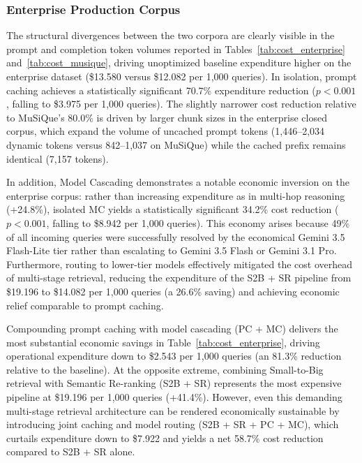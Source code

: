 \subsubsection{Enterprise Production Corpus}
\label{subsubsec:cost_enterprise}

The structural divergences between the two corpora are clearly visible in the prompt and completion token volumes reported in Tables~\ref{tab:cost_enterprise} and~\ref{tab:cost_musique}, driving unoptimized baseline expenditure higher on the enterprise dataset (\$13.580 versus \$12.082 per 1,000 queries). In isolation, prompt caching achieves a statistically significant 70.7\% expenditure reduction ($p < 0.001$, falling to \$3.975 per 1,000 queries). The slightly narrower cost reduction relative to MuSiQue's 80.0\% is driven by larger chunk sizes in the enterprise closed corpus, which expand the volume of uncached prompt tokens (1,446--2,034 dynamic tokens versus 842--1,037 on MuSiQue) while the cached prefix remains identical (7,157 tokens).

In addition, Model Cascading demonstrates a notable economic inversion on the enterprise corpus: rather than increasing expenditure as in multi-hop reasoning (+24.8\%), isolated MC yields a statistically significant 34.2\% cost reduction ($p < 0.001$, falling to \$8.942 per 1,000 queries). This economy arises because 49\% of all incoming queries were successfully resolved by the economical Gemini 3.5 Flash-Lite tier rather than escalating to Gemini 3.5 Flash or Gemini 3.1 Pro. Furthermore, routing to lower-tier models effectively mitigated the cost overhead of multi-stage retrieval, reducing the expenditure of the S2B + SR pipeline from \$19.196 to \$14.082 per 1,000 queries (a 26.6\% saving) and achieving economic relief comparable to prompt caching.



Compounding prompt caching with model cascading (PC + MC) delivers the most substantial economic savings in Table~\ref{tab:cost_enterprise}, driving operational expenditure down to \$2.543 per 1,000 queries (an 81.3\% reduction relative to the baseline). At the opposite extreme, combining Small-to-Big retrieval with Semantic Re-ranking (S2B + SR) represents the most expensive pipeline at \$19.196 per 1,000 queries (+41.4\%). However, even this demanding multi-stage retrieval architecture can be rendered economically sustainable by introducing joint caching and model routing (S2B + SR + PC + MC), which curtails expenditure down to \$7.922 and yields a net 58.7\% cost reduction compared to S2B + SR alone.  

